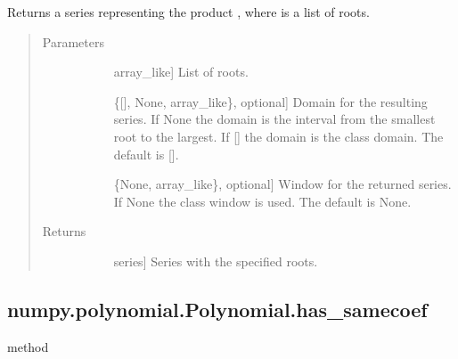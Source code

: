 \documentclass[letterpaper,10pt,english]{sphinxmanual}
\begin{document}
\begin{fulllineitems}
\begin{fulllineitems}
Returns a series representing the product
, where  is a
list of roots.
\begin{quote}\begin{description}
\item[{Parameters}] \leavevmode\begin{description}
\item[{}] \leavevmode{[}array\_like{]}
List of roots.

\item[{}] \leavevmode{[}\{{[}{]}, None, array\_like\}, optional{]}
Domain for the resulting series. If None the domain is the
interval from the smallest root to the largest. If {[}{]} the
domain is the class domain. The default is {[}{]}.

\item[{}] \leavevmode{[}\{None, array\_like\}, optional{]}
Window for the returned series. If None the class window is
used. The default is None.

\end{description}

\item[{Returns}] \leavevmode\begin{description}
\item[{}] \leavevmode{[}series{]}
Series with the specified roots.

\end{description}

\end{description}\end{quote}

\end{fulllineitems}



\subsection{numpy.polynomial.Polynomial.has\_samecoef}
\label{\detokenize{generated/generated/numpy.polynomial.Polynomial.has_samecoef:numpy-polynomial-polynomial-has-samecoef}}\label{\detokenize{generated/generated/numpy.polynomial.Polynomial.has_samecoef::doc}}
method


\end{fulllineitems}
\end{document}

